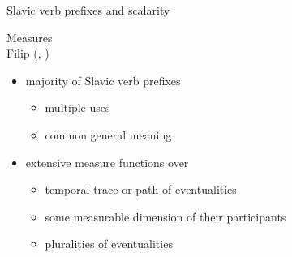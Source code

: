 \documentclass[12pt]{beamer}
\begin{document}
\begin{frame}{Slavic verb prefixes and scalarity}

Measures\\\scriptsize Filip (\citeyear{filip1992aspect}, \citeyear{filip2000quantization})\normalsize

\begin{itemize}
\item majority of Slavic verb prefixes 
\begin{itemize}
	\item multiple uses
	\item common general meaning 
\end{itemize}
\item extensive measure functions over
\begin{itemize}
\item temporal trace or path of eventualities
\item some measurable dimension of their participants%
\item pluralities of eventualities
\end{itemize}
\end{itemize}

\end{frame}
\end{document}
